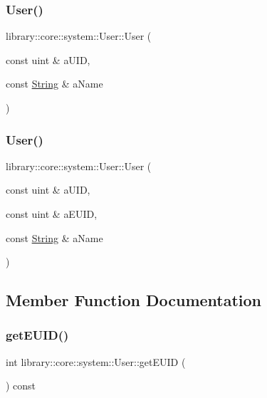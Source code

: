 \subsubsection{\texorpdfstring{User()}{User()}\hspace{0.1cm}{\footnotesize\ttfamily [1/2]}}
{\footnotesize\ttfamily library\+::core\+::system\+::\+User\+::\+User (\begin{DoxyParamCaption}\item[{const uint \&}]{a\+U\+ID,  }\item[{const \hyperlink{classlibrary_1_1core_1_1types_1_1String}{String} \&}]{a\+Name }\end{DoxyParamCaption})}

\mbox{\label{classlibrary_1_1core_1_1system_1_1User_a399449d4a49ca4ce9c060e17b0783fc8}} 
\subsubsection{\texorpdfstring{User()}{User()}\hspace{0.1cm}{\footnotesize\ttfamily [2/2]}}
{\footnotesize\ttfamily library\+::core\+::system\+::\+User\+::\+User (\begin{DoxyParamCaption}\item[{const uint \&}]{a\+U\+ID,  }\item[{const uint \&}]{a\+E\+U\+ID,  }\item[{const \hyperlink{classlibrary_1_1core_1_1types_1_1String}{String} \&}]{a\+Name }\end{DoxyParamCaption})}



\subsection{Member Function Documentation}
\mbox{\label{classlibrary_1_1core_1_1system_1_1User_a57d138f9dc1cd5994ef06f54974f16bc}} 
\subsubsection{\texorpdfstring{get\+E\+U\+I\+D()}{getEUID()}}
{\footnotesize\ttfamily int library\+::core\+::system\+::\+User\+::get\+E\+U\+ID (\begin{DoxyParamCaption}{ }\end{DoxyParamCaption}) const}

